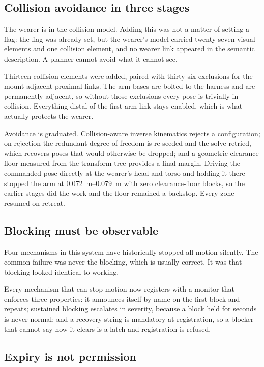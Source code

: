 \subsection{Collision avoidance in three stages}

The wearer is in the collision model. Adding this was not a matter of setting
a flag: the flag was already set, but the wearer's model carried
twenty-seven visual elements and one collision element, and no wearer link
appeared in the semantic description. A planner cannot avoid what it cannot
see.

Thirteen collision elements were added, paired with thirty-six exclusions for
the mount-adjacent proximal links. The arm bases are bolted to the harness and
are permanently adjacent, so without those exclusions every pose is trivially
in collision. Everything distal of the first arm link stays enabled, which is
what actually protects the wearer.

Avoidance is graduated. Collision-aware inverse kinematics rejects a
configuration; on rejection the redundant degree of freedom is re-seeded and
the solve retried, which recovers poses that would otherwise be dropped; and a
geometric clearance floor measured from the transform tree provides a final
margin. Driving the commanded pose directly at the wearer's head and torso and
holding it there stopped the arm at \SIrange{0.072}{0.079}{\metre} with zero
clearance-floor blocks, so the earlier stages did the work and the floor
remained a backstop. Every zone resumed on retreat.

\subsection{Blocking must be observable}

Four mechanisms in this system have historically stopped all motion silently.
The common failure was never the blocking, which is usually correct. It was
that blocking looked identical to working.

Every mechanism that can stop motion now registers with a monitor that
enforces three properties: it announces itself by name on the first block and
repeats; sustained blocking escalates in severity, because a block held for
seconds is never normal; and a recovery string is mandatory at registration,
so a blocker that cannot say how it clears is a latch and registration is
refused.

\subsection{Expiry is not permission}

